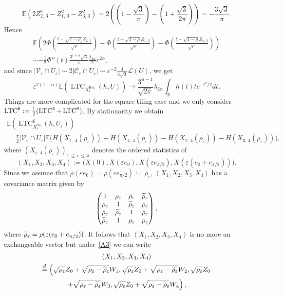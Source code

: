 \documentclass[AHL,Unicode,longabstracts,published]{cedram}
\newcommand{\R}{\mathbb{R}}
\newcommand{\E}{\mathbb{E}}
\newcommand{\eps}{\varepsilon}
\DeclareMathOperator{\LTC}{LTC}
\DeclareMathOperator{\Hex}{Hex}
\DeclareMathOperator{\Sq}{Sq}
\newcommand{\calL}{\mathcal{L}}
\newcommand{\calC}{\mathcal{C}}
\newcommand{\calV}{\mathcal{V}}
\let\oldtilde\tilde
\renewcommand*{\tilde}[1]{\mathchoice{\widetilde{#1}}{\widetilde{#1}}{\oldtilde{#1}}{\oldtilde{#1}}}
\begin{document}
\[
\E\left(2Z_{2,\,3}^2-Z_{1,\,3}^2-Z_{3,\,3}^2\right)=2\left(\left(1-\frac{\sqrt{3}}{\pi}\right)-\left(1+\frac{\sqrt{3}}{2\pi}\right)\right)=-\frac{3\sqrt{3}}{\pi}.
\]
Hence
\begin{multline*}
\E\left(2\Phi\left(\frac{t-\sqrt{1-\rho_\eps}Z_{2,\,3}}{\sqrt{\rho}}\right)-\Phi\left(\frac{t-\sqrt{1-\rho}Z_{1,\,3}}{\sqrt{\rho}}\right)-\Phi\left(\frac{t-\sqrt{1-\rho}Z_{1,\,3}}{\sqrt{\rho}}\right)\right)
\\
\sim -\frac{1}{2}\Phi''(t)\frac{3^{1+\alpha}\sqrt{3}}{\pi}\frac{\lambda_{{2\alpha}}}{2}\eps^{2\alpha},
\end{multline*}
and since $|\calV_\eps\cap U_\eps|\sim 2 |\calC_\eps\cap U_\eps|\sim \eps^{-2}\frac{4}{3\sqrt{3}}{\calL}(U)$, we get
\[
\eps^{2(1-\alpha)}\E\left(\LTC_{X_\eps^{\Hex}}(h,U)\right)\longrightarrow \frac{3^{\alpha-1}}{\sqrt{2\pi}}\lambda_{{2\alpha}}\int_{\R}h(t)te^{-t^2/2}dt.
\]
Things are more complicated for the square tiling case and we only consider $\LTC^6\linebreak :=\frac{1}{2}(\LTC^4+\LTC^8)$. By stationarity we obtain
\begin{multline*}
\E\left(\LTC^6_{X_\eps^{\Sq}}(h,U_\eps)\right)\\
=\frac{\pi}{2}\left|\calV_\eps\cap U_\eps\right|
\E\big(H\left(X_{1,\,4}(\rho_\eps)\right)+H\left(X_{4,\,4}(\rho_\eps)\right)-H\left(X_{2,\,4}(\rho_\eps)\right)-H\left(X_{3,\,4}(\rho_\eps)\right)\big),
\end{multline*}
where $(X_{i,\,4}(\rho_\eps))_{1\,\le\,i\,\le\,4}$ denotes the ordered statistics of
\[
\left(X_1,X_2,X_3,X_4\right):=\big(X(0),X(\eps e_0),X(\eps e_{\pi/2}),X(\eps (e_0+e_{\pi/2}))\big).
\]
Since we assume that $\rho(\eps e_0)=\rho(\eps e_{\pi/2}):=\rho_\eps$, $(X_1,X_2,X_3,X_4)$ has a covariance matrix given by
\[
\begin{pmatrix}
1&\rho_\eps& \rho_\eps& \tilde{\rho}_\eps\\
\rho_\eps&1& \tilde{\rho}_\eps& \rho_\eps\\
\rho_\eps&\tilde{\rho}_\eps& 1&\rho_\eps\\
\tilde{\rho}_\eps& 1&\rho_\eps&\rho_\eps
\end{pmatrix},
\]
where $\tilde{\rho}_\eps=\rho(\eps (e_0+e_{\pi/2}))$. It follows that $(X_1,X_2,X_3,X_4)$ is no more an exchangeable vector but under~\eqref{A3} we can write
\begin{multline*}
\left(X_1,X_2,X_3,X_4\right)
\\
\stackrel{d}{=}\left(\sqrt{\rho_\eps}Z_0 +\sqrt{\rho_\eps-\tilde{\rho}_\eps}W_1,\sqrt{\rho_\eps}Z_0+\sqrt{\rho_\eps-\tilde{\rho}_\eps}W_2,\sqrt{\rho_\eps}Z_0\right.\\
\left. +\sqrt{\rho_\eps-\tilde{\rho}_\eps}W_3,\sqrt{\rho_\eps}Z_0+\sqrt{\rho_\eps-\tilde{\rho}_\eps}W_4\right),
\end{multline*}
\end{document}
